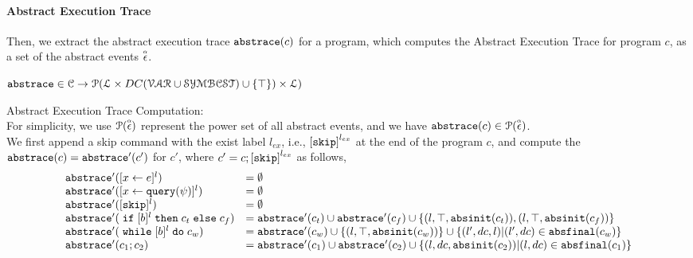  \paragraph{Abstract Execution Trace}
 Then, we  extract the abstract execution trace  $\mathtt{abs}{\mathtt{trace}}(c)$ for a program, which computes the Abstract Execution Trace for program $c$, as a set of the abstract events $\stackrel{\scriptscriptstyle{\alpha}}{\mathtt{\epsilon}{}}$.
 \begin{defn}
 \label{def:abs_trace}
  $\mathtt{abs}{\mathtt{trace}} \in \mathcal{C} \to \mathcal{P}( \mathcal{L} \times DC(\mathcal{VAR}  \cup \mathcal{SYMBCST}) \cup \{\top\}) \times \mathcal{L} )$
  \end{defn}
 Abstract Execution Trace Computation:
  \\
  For simplicity, we use $\mathcal{P}(\stackrel{\scriptscriptstyle{\alpha}}{\mathtt{\epsilon}{}})$ represent the power set of all abstract events, and we have $\mathtt{abs}{\mathtt{trace}}(c) \in \mathcal{P}(\stackrel{\scriptscriptstyle{\alpha}}{\mathtt{\epsilon}{}})$.
 \\
 We first append a skip command with 
the exist label $l_{ex}$, i.e., $\clabel{\eskip}^{l_{ex}}$ at the end of the program $c$, 
and compute the $\mathtt{abs}{\mathtt{trace}}(c) = \mathtt{abs}{\mathtt{trace}}'(c')$ for $c'$, where $c' = c;\clabel{\eskip}^{l_{ex}}$ as follows,
 {\footnotesize
 \[
   \begin{array}{ll}
      \absflow'(\clabel{\assign{x}{\expr}}{}^l)  & = \emptyset  \\
      \absflow'(\clabel{\assign{x}{\query(\qexpr)}}{}^l)  & = \emptyset  \\
      \absflow'([\eskip]^{l})  & = \emptyset \\
      \absflow'(\eif [b]^l \ethen c_t \eelse c_f)  & =  \absflow'(c_t) \cup \absflow'(c_f)
        \cup \{(l, \top,  \absinit(c_t) ) ,  (l, \top, \absinit(c_f)) \} \\
       \absflow'(\ewhile [b]^l \edo c_w)  & =  \absflow'(c_w) \cup \{(l, \top, \absinit(c_w)) \} 
       \cup \{(l', dc, l)| (l', dc) \in \absfinal(c_w) \} \\
       \absflow'(c_1 ; c_2)  & = \absflow'(c_1) \cup  \absflow'(c_2) 
       \cup \{ (l, dc, \absinit(c_2)) | (l, dc) \in \absfinal(c_1) \} \\
   \end{array}
   \]
   }

